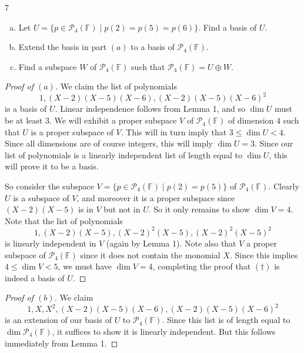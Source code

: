 \documentclass[11pt]{extarticle}
\newenvironment{problem}[1]{\begin{prob*}{#1}{}}{\end{prob*}}
\newcommand{\F}{\mathbb{F}}
\begin{document}
\begin{problem}{7}
\begin{enumerate}[(a)]
\item Let $U=\{p\in\mathcal{P}_4(\F)\mid p(2)=p(5)=p(6)\}$.  Find a basis of $U$.
\item Extend the basis in part $(a)$ to a basis of $\mathcal{P}_4(\F)$.
\item Find a subspace $W$ of $\mathcal{P}_4(\F)$ such that $\mathcal{P}_4(\F)=U\oplus W$.
\end{enumerate}
\end{problem}
\begin{proof}[Proof of $(a)$]
We claim the list of polynomials
\begin{equation}\tag{$\dagger$}
1, (X - 2)(X-5)(X-6), (X-2)(X-5)(X-6)^2
\end{equation}
is a basis of $U$.  Linear independence follows from Lemma 1, and so $\dim U$ must be at least $3$.  We will exhibit a proper subspace $V$ of $\mathcal{P}_4(\F)$ of dimension $4$ such that $U$ is a proper subspace of $V$.  This will in turn imply that $3\leq \dim U < 4$.  Since all dimensions are of course integers, this will imply $\dim U=3$.  Since our list of polynomials is a linearly independent list of length equal to $\dim U$, this will prove it to be a basis.
\par So consider the subspace $V = \{p\in\mathcal{P}_4(\F)\mid p(2)=p(5)\}$ of $\mathcal{P}_4(\F)$.  Clearly $U$ is a subspace of $V$, and moreover it is a proper subspace since $(X-2)(X-5)$ is in $V$ but not in $U$.  So it only remains to show $\dim V = 4$.  Note that the list of polynomials
\begin{equation*}
1, (X-2)(X-5), (X-2)^2(X-5), (X-2)^2(X-5)^2
\end{equation*}
is linearly independent in $V$ (again by Lemma 1).   Note also that $V$ a proper subspace of $\mathcal{P}_4(\F)$ since it does not contain the monomial $X$.  Since this implies $4\leq \dim V < 5$, we must have $\dim V = 4$, completing the proof that $(\dagger)$ is indeed a basis of $U$.
\end{proof}
\begin{proof}[Proof of $(b)$]
We claim 
\begin{equation*}
1, X, X^2, (X - 2)(X-5)(X-6), (X-2)(X-5)(X-6)^2
\end{equation*}
is an extension of our basis of $U$ to $\mathcal{P}_4(\F)$.  Since this list is of length equal to $\dim\mathcal{P}_4(\F)$, it suffices to show it is linearly independent.  But this follows immediately from Lemma 1.
\end{proof}
\end{document}
